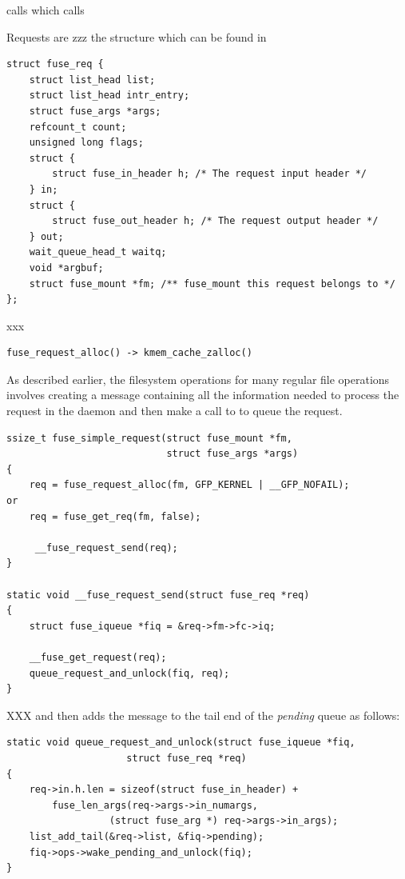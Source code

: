 \noindent
{} calls  which calls 

\noindent
Requests are zzz the  structure which can be found in 

\begin{lstlisting}
struct fuse_req {
    struct list_head list;
    struct list_head intr_entry;
    struct fuse_args *args;
    refcount_t count;
    unsigned long flags;
    struct {
        struct fuse_in_header h; /* The request input header */
    } in;
    struct {
        struct fuse_out_header h; /* The request output header */
    } out;
    wait_queue_head_t waitq;
    void *argbuf;
    struct fuse_mount *fm; /** fuse_mount this request belongs to */
};
\end{lstlisting}

\noindent
xxx

\begin{lstlisting}
fuse_request_alloc() -> kmem_cache_zalloc()
\end{lstlisting}

\noindent
As described earlier, the  filesystem operations for many regular file operations involves creating a message containing all the information needed to process the request in the  daemon and then make a call to  to queue the request.

\begin{lstlisting}
ssize_t fuse_simple_request(struct fuse_mount *fm, 
                            struct fuse_args *args)
{
    req = fuse_request_alloc(fm, GFP_KERNEL | __GFP_NOFAIL);
or
    req = fuse_get_req(fm, false);
 
     __fuse_request_send(req);
}

static void __fuse_request_send(struct fuse_req *req)
{
    struct fuse_iqueue *fiq = &req->fm->fc->iq;

    __fuse_get_request(req);
    queue_request_and_unlock(fiq, req);
}
\end{lstlisting}

\noindent
XXX and then adds the message to the tail end of the \textit{pending} queue as follows:

\begin{lstlisting}
static void queue_request_and_unlock(struct fuse_iqueue *fiq,
                     struct fuse_req *req)
{
    req->in.h.len = sizeof(struct fuse_in_header) +
        fuse_len_args(req->args->in_numargs,
                  (struct fuse_arg *) req->args->in_args);
    list_add_tail(&req->list, &fiq->pending);
    fiq->ops->wake_pending_and_unlock(fiq);
}
\end{lstlisting}

